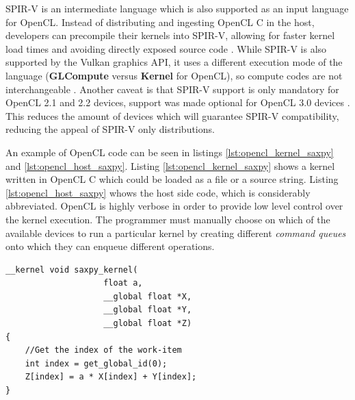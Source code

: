 SPIR-V is an intermediate language which is also supported as an input language for OpenCL. Instead of distributing and ingesting OpenCL C in the host, developers can precompile their kernels into SPIR-V, allowing for faster kernel load times and avoiding directly exposed source code \cite{spir_overview}. While SPIR-V is also supported by the Vulkan \cite{vulkan} graphics API, it uses a different execution mode of the language (\textbf{GLCompute} versus \textbf{Kernel} for OpenCL), so compute codes are not interchangeable \cite{spir_spec}. Another caveat is that SPIR-V support is only mandatory for OpenCL 2.1 and 2.2 devices, support was made optional for OpenCL 3.0 devices \cite{opencl_spec}. This reduces the amount of devices which will guarantee SPIR-V compatibility, reducing the appeal of SPIR-V only distributions.

An example of OpenCL code can be seen in listings \ref{lst:opencl_kernel_saxpy} and \ref{lst:opencl_host_saxpy}. Listing \ref{lst:opencl_kernel_saxpy} shows a kernel written in OpenCL C which could be loaded as a file or a source string. Listing \ref{lst:opencl_host_saxpy} whows the host side code, which is considerably abbreviated. OpenCL is highly verbose in order to provide low level control over the kernel execution. The programmer must manually choose on which of the available devices to run a particular kernel by creating different \textit{command queues} onto which they can enqueue different operations. 

\begin{lstlisting}[style=CStyle, caption=OpenCL saxpy example (kernel), float, floatplacement=H, label={lst:opencl_kernel_saxpy}]
__kernel void saxpy_kernel(                
                    float a,             
                    __global float *X,       
                    __global float *Y,       
                    __global float *Z)       
{                                          
    //Get the index of the work-item       
    int index = get_global_id(0);          
    Z[index] = a * X[index] + Y[index]; 
}                                          
\end{lstlisting}

